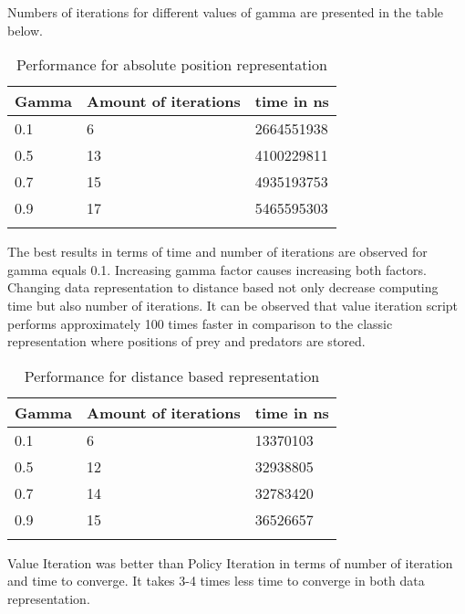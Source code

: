 Numbers of iterations for different values of gamma are presented in the table below. 

\begin{longtable}{| p{} | p{} | p{} |} 
   Gamma & Amount of iterations & time in ns \\
    \hline
0.1 & 6 &   2664551938 \\
0.5 & 13 & 4100229811\\
0.7 & 15 & 4935193753\\
0.9 &17 &  5465595303\\
\caption{Performance for absolute position representation} 
\label{tab:myfirstlongtable}
\end{longtable}

The best results in terms of time and number of iterations are observed for gamma equals 0.1. Increasing gamma factor causes increasing both factors. Changing data representation to distance based not only decrease computing time but also number of iterations. It can be observed that value iteration script performs approximately 100 times faster in comparison to the classic representation where positions of prey and predators are stored.

\begin{longtable}{| p{} | p{} | p{} |} 
   Gamma & Amount of iterations & time in ns \\
    \hline
0.1 & 6 & 13370103 \\
0.5 & 12 &32938805\\
0.7 & 14 &32783420\\
0.9 &15 & 36526657\\
\caption{Performance for distance based representation} 
\label{tab:myfirstlongtable}
\end{longtable}

Value Iteration was better than Policy Iteration in terms of number of iteration and time to converge. It takes 3-4 times less time to converge in both data representation.



